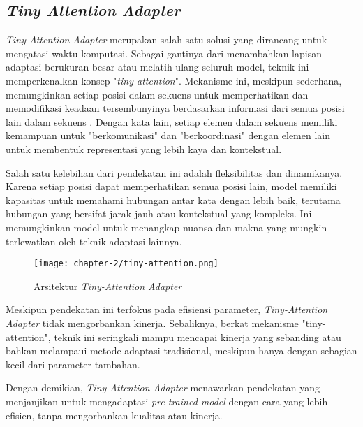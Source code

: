\subsection{\textit{Tiny Attention Adapter}}

\textit{Tiny-Attention Adapter} merupakan salah satu solusi yang dirancang untuk mengatasi waktu komputasi. Sebagai gantinya dari menambahkan lapisan adaptasi berukuran besar atau melatih ulang seluruh model, teknik ini memperkenalkan konsep "\textit{tiny-attention}". Mekanisme ini, meskipun sederhana, memungkinkan setiap posisi dalam sekuens untuk memperhatikan dan memodifikasi keadaan tersembunyinya berdasarkan informasi dari semua posisi lain dalam sekuens \parencite{tinyattention}. Dengan kata lain, setiap elemen dalam sekuens memiliki kemampuan untuk "berkomunikasi" dan "berkoordinasi" dengan elemen lain untuk membentuk representasi yang lebih kaya dan kontekstual.

Salah satu kelebihan dari pendekatan ini adalah fleksibilitas dan dinamikanya. Karena setiap posisi dapat memperhatikan semua posisi lain, model memiliki kapasitas untuk memahami hubungan antar kata dengan lebih baik, terutama hubungan yang bersifat jarak jauh atau kontekstual yang kompleks. Ini memungkinkan model untuk menangkap nuansa dan makna yang mungkin terlewatkan oleh teknik adaptasi lainnya.

\begin{figure}[ht]
    \centering
    \texttt{[image: chapter-2/tiny-attention.png]}
    \caption{Arsitektur \textit{Tiny-Attention Adapter} \parencite{tinyattention}}
    \label{fig:tiny-attention}
\end{figure}


Meskipun pendekatan ini terfokus pada efisiensi parameter, \textit{Tiny-Attention Adapter} tidak mengorbankan kinerja. Sebaliknya, berkat mekanisme "tiny-attention", teknik ini seringkali mampu mencapai kinerja yang sebanding atau bahkan melampaui metode adaptasi tradisional, meskipun hanya dengan sebagian kecil dari parameter tambahan.

Dengan demikian, \textit{Tiny-Attention Adapter} menawarkan pendekatan yang menjanjikan untuk mengadaptasi \textit{pre-trained model} dengan cara yang lebih efisien, tanpa mengorbankan kualitas atau kinerja.